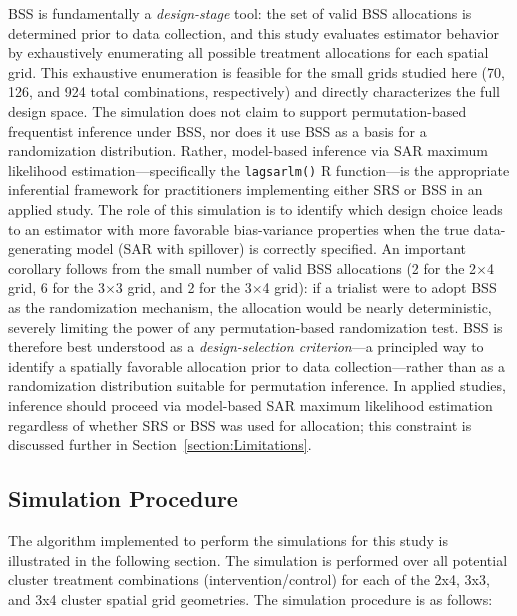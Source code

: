 \documentclass{article}[11pt]
\begin{document}
BSS is fundamentally a \emph{design-stage} tool: the set of valid BSS allocations is determined prior to data collection, and this study evaluates estimator behavior by exhaustively enumerating all possible treatment allocations for each spatial grid. This exhaustive enumeration is feasible for the small grids studied here (70, 126, and 924 total combinations, respectively) and directly characterizes the full design space. The simulation does not claim to support permutation-based frequentist inference under BSS, nor does it use BSS as a basis for a randomization distribution. Rather, model-based inference via SAR maximum likelihood estimation---specifically the \texttt{lagsarlm()} R function---is the appropriate inferential framework for practitioners implementing either SRS or BSS in an applied study. The role of this simulation is to identify which design choice leads to an estimator with more favorable bias-variance properties when the true data-generating model (SAR with spillover) is correctly specified. An important corollary follows from the small number of valid BSS allocations (2 for the 2$\times$4 grid, 6 for the 3$\times$3 grid, and 2 for the 3$\times$4 grid): if a trialist were to adopt BSS as the randomization mechanism, the allocation would be nearly deterministic, severely limiting the power of any permutation-based randomization test. BSS is therefore best understood as a \emph{design-selection criterion}---a principled way to identify a spatially favorable allocation prior to data collection---rather than as a randomization distribution suitable for permutation inference. In applied studies, inference should proceed via model-based SAR maximum likelihood estimation regardless of whether SRS or BSS was used for allocation; this constraint is discussed further in Section~\ref{section:Limitations}.

\subsection{Simulation Procedure}

The algorithm implemented to perform the simulations for this study is illustrated in the following section. The simulation is performed over all potential cluster treatment combinations (intervention/control) for each of the 2x4, 3x3, and 3x4 cluster spatial grid geometries. The simulation procedure is as follows:
\end{document}

